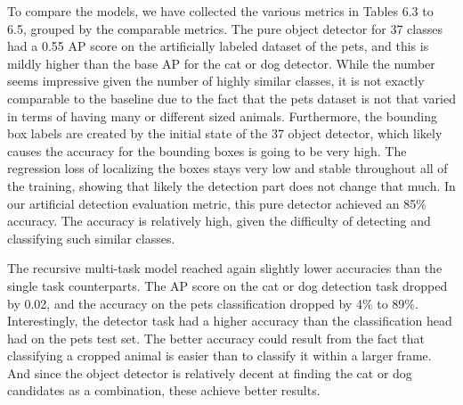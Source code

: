 To compare the models, we have collected the various metrics in Tables 6.3 to 6.5, grouped by the comparable metrics. 
The pure object detector for 37 classes had a 0.55 AP score on the artificially labeled dataset of the pets, and this is mildly higher than the base AP for the cat or dog detector.
While the number seems impressive given the number of highly similar classes, it is not exactly comparable to the baseline due to the fact that the pets dataset is not that varied in terms of having many or different sized animals.
Furthermore, the bounding box labels are created by the initial state of the 37 object detector, which likely causes the accuracy for the bounding boxes is going to be very high.
The regression loss of localizing the boxes stays very low and stable throughout all of the training, showing that likely the detection part does not change that much.
In our artificial detection evaluation metric, this pure detector achieved an 85\% accuracy.
The accuracy is relatively high, given the difficulty of detecting and classifying such similar classes.

The recursive multi-task model reached again slightly lower accuracies than the single task counterparts.
The AP score on the cat or dog detection task dropped by 0.02, and the accuracy on the pets classification dropped by 4\% to 89\%.
Interestingly, the detector task had a higher accuracy than the classification head had on the pets test set.
The better accuracy could result from the fact that classifying a cropped animal is easier than to classify it within a larger frame.
And since the object detector is relatively decent at finding the cat or dog candidates as a combination, these achieve better results.


